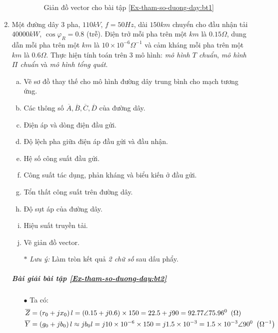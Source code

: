 \begin{enumerate}
\begin{enumerate}[\it a.]
\begin{figure}[!h]
\begin{center}
						\end{center}
						\caption{Giản đồ vector cho bài tập \ref{Ex-tham-so-duong-day:bt1}} \label{Fig:gian-do-vector-bt1}
					\end{figure}
			\end{enumerate}
		
		\item \label{Ex-tham-so-duong-day:bt2} Một đường dây 3 pha, $110 \unit{kV}$, $f=50Hz$, dài $150 \unit{km}$ chuyển cho đầu nhận tải $40000 \unit{kW}$, $\cos \varphi_R = 0.8$ (trễ). Điện trở mỗi pha trên một $km$ là $0.15 \unit{\Omega}$,  dung dẫn mỗi pha trên một $km$ là $10 \times 10^{-6} \unit{\Omega^{-1}}$ và cảm kháng mỗi pha trên một $km$ là $0.6 \unit{\Omega}$. Thực hiện tính toán trên 3 mô hình: \emph{mô hình $T$ chuẩn},  \emph{mô hình $\Pi$ chuẩn} và \emph{mô hình tổng quát}.
			\begin{enumerate}[a.]
				\item Vẽ sơ đồ thay thế cho mô hình đường dây trung bình cho mạch tương ứng.
				\item Các thông số $\overline{A}, \overline{B}, \overline{C}, \overline{D}$ của đường dây.
				\item Điện áp và dòng điện đầu gửi.
				\item Độ lệch pha giữa điện áp đầu gửi và đầu nhận.
				\item Hệ số công suất đầu gửi.
				\item Công suất tác dụng, phản kháng và biểu kiến ở đầu gửi.
				\item Tổn thất công suất trên đường dây.
				\item Độ sụt áp của đường dây.
				\item Hiệu suất truyền tải.
				\item Vẽ giản đồ vector.
				\item[$\ast$] \emph{Lưu ý:} Làm tròn kết quả \emph{2 chữ số} sau dấu phẩy.
			\end{enumerate}
			
		\subparagraph{Bài giải bài tập \ref{Ex-tham-so-duong-day:bt2}}
			\begin{enumerate}[ \it a.]
				\item[$\bullet$] Ta có:
					\begin{align*}
						\overline{Z} & = \left({r_0 + j x_0}\right)l = \left({0.15 +j 0.6}\right)\times 150 = 22.5 + j 90 = 92.77 \angle 75.96^0 ~\left({\Omega}\right)\\
						\overline{Y} & = \left({g_0 + j b_0}\right)l \approx j b_0 l = j 10 \times 10^{-6}\times 150 = j 1.5 \times 10^{-3} = 1.5 \times 10^{-3} \angle 90^0 ~\left({\Omega^{-1}}\right)
					\end{align*}
				

\end{enumerate}
\end{enumerate}
